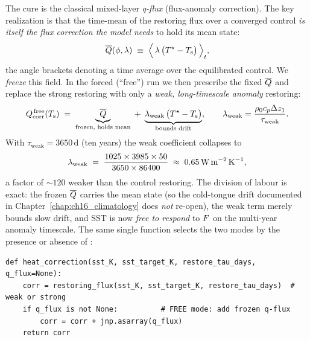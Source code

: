 The cure is the classical mixed-layer \emph{q-flux} (flux-anomaly correction).
The key realization is that the time-mean of the restoring flux over a converged
control \emph{is itself the flux correction the model needs} to hold its mean
state:
\begin{equation}
  \overline{Q}(\phi,\lambda) \;\equiv\;
  \Bigl\langle\, \lambda\,\bigl(T^{\star} - T_{\mathrm{s}}\bigr) \,\Bigr\rangle_t,
  \label{eq:f14_qbar}
\end{equation}
the angle brackets denoting a time average over the equilibrated control. We
\emph{freeze} this field. In the forced (``free'') run we then prescribe the
fixed $\overline{Q}$ and replace the strong restoring with only a \emph{weak,
long-timescale anomaly} restoring:
\begin{equation}
  Q_{\mathrm{corr}}^{\,\mathrm{free}}(T_{\mathrm{s}})
  \;=\; \underbrace{\overline{Q}}_{\text{frozen, holds mean}}
  \;+\; \underbrace{\lambda_{\mathrm{weak}}\,\bigl(T^{\star} - T_{\mathrm{s}}\bigr)}_{\text{bounds drift}},
  \qquad
  \lambda_{\mathrm{weak}} = \frac{\rho_0 c_p \Delta z_1}{\tau_{\mathrm{weak}}}.
  \label{eq:f14_free}
\end{equation}
With $\tau_{\mathrm{weak}}=3650\,\mathrm{d}$ (ten years) the weak coefficient
collapses to
\begin{equation}
  \lambda_{\mathrm{weak}}
  \;=\; \frac{1025\times 3985\times 50}{3650\times 86400}
  \;\approx\; 0.65\,\mathrm{W\,m^{-2}\,K^{-1}},
  \label{eq:f14_lambdaweak}
\end{equation}
a factor of $\sim\!120$ weaker than the control restoring. The division of labour
is exact: the frozen $\overline{Q}$ carries the mean state (so the cold-tongue drift
documented in Chapter~\ref{chap:ch16_climatology} does \emph{not} re-open), the
weak term merely bounds slow drift, and SST is now \emph{free to respond} to
$F$ on the multi-year anomaly timescale. The same single function selects the
two modes by the presence or absence of :

\begin{lstlisting}[caption={One function, two modes: control restoring vs free q-flux.}]
def heat_correction(sst_K, sst_target_K, restore_tau_days, q_flux=None):
    corr = restoring_flux(sst_K, sst_target_K, restore_tau_days)  # weak or strong
    if q_flux is not None:          # FREE mode: add frozen q-flux
        corr = corr + jnp.asarray(q_flux)
    return corr
\end{lstlisting}

